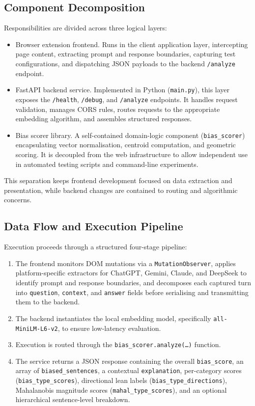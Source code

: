 \documentclass[runningheads]{llncs}
\begin{document}
\subsection{Component Decomposition}
\label{subsec:components}
Responsibilities are divided across three logical layers:
\begin{itemize}
  \item Browser extension frontend. Runs in the client application layer, intercepting page content, extracting prompt and response boundaries, capturing test configurations, and dispatching JSON payloads to the backend \texttt{/analyze} endpoint.
  \item FastAPI backend service. Implemented in Python (\texttt{main.py}), this layer exposes the \texttt{/health},
        \texttt{/debug}, and \texttt{/analyze} endpoints. It handles request validation, manages CORS rules, routes requests to the appropriate embedding algorithm, and assembles structured responses.
  \item Bias scorer library. A self-contained domain-logic component (\texttt{bias\_scorer}) encapsulating vector normalisation, centroid computation, and geometric scoring. It is decoupled from the web infrastructure to allow independent use in automated testing scripts and command-line experiments.
\end{itemize}
This separation keeps frontend development focused on data extraction and presentation, while backend changes are contained to routing and algorithmic concerns.

\subsection{Data Flow and Execution Pipeline}
\label{subsec:dataflow}
Execution proceeds through a structured four-stage pipeline:
\begin{enumerate}
  \item The frontend monitors DOM mutations via a \texttt{MutationObserver}, applies platform-specific extractors for ChatGPT, Gemini, Claude, and DeepSeek to identify prompt and response boundaries, and decomposes each captured turn into \texttt{question}, \texttt{context}, and \texttt{answer} fields before serialising and transmitting them to the
        backend.
  \item The backend instantiates the local embedding model, specifically \texttt{all-MiniLM-L6-v2}, to ensure low-latency evaluation.
  \item Execution is routed through the \texttt{bias\_scorer.analyze(\ldots)} function.
  \item The service returns a JSON response containing the overall \texttt{bias\_score}, an array of \texttt{biased\_sentences}, a
        contextual \texttt{explanation}, per-category scores (\texttt{bias\_type\_scores}), directional lean labels
        (\texttt{bias\_type\_directions}), Mahalanobis magnitude scores (\texttt{mahal\_type\_scores}), and an optional hierarchical
        sentence-level breakdown.
\end{enumerate}
\end{document}
